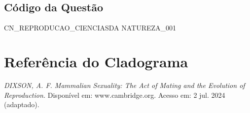 \documentclass{article}
\begin{document}
\subsection*{Código da Questão}

CN\_REPRODUCAO\_CIENCIASDA NATUREZA\_001

\bigskip

\section*{Referência do Cladograma}

\textit{DIXSON, A. F. Mammalian Sexuality: The Act of Mating and the Evolution of Reproduction.} Disponível em: www.cambridge.org. Acesso em: 2 jul. 2024 (adaptado).

\bigskip

\end{document}
